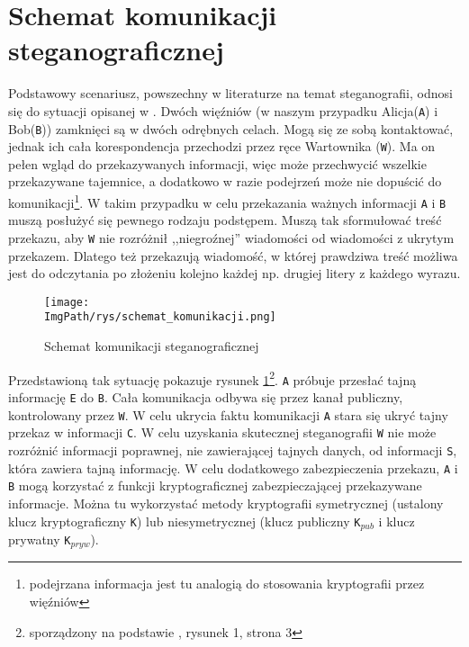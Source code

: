 \documentclass[a4paper,12pt,twoside,openany]{report}
\newcommand{\ImgPath}{.}
\newcommand{\tech}{\texttt}
\begin{document}
\section{Schemat komunikacji steganograficznej}
\label{sectionSchematKomunikacjiSteganograficznej}
Podstawowy scenariusz, powszechny w literaturze na temat steganografii, odnosi się do sytuacji opisanej w \cite{PrisonersProblem}. Dwóch więźniów (w naszym przypadku Alicja(\tech{A}) i Bob(\tech{B})) zamknięci są w dwóch odrębnych celach. Mogą się ze sobą kontaktować, jednak ich cała korespondencja przechodzi przez ręce Wartownika (\tech{W}). Ma on pełen wgląd do przekazywanych informacji, więc może przechwycić wszelkie przekazywane tajemnice, a dodatkowo w razie podejrzeń może nie dopuścić do komunikacji\footnote{podejrzana informacja jest tu analogią do stosowania kryptografii przez więźniów}. W takim przypadku w celu przekazania ważnych informacji \tech{A} i \tech{B} muszą posłużyć się pewnego rodzaju podstępem. Muszą tak sformułować treść przekazu, aby \tech{W} nie rozróżnił ,,niegroźnej'' wiadomości od wiadomości z ukrytym przekazem. Dlatego też przekazują wiadomość, w której prawdziwa treść możliwa jest do odczytania po złożeniu kolejno każdej np.  drugiej litery z każdego wyrazu.
\begin{figure}[!htbp]
	\begin{center}
\centering
\texttt{[image: \\ImgPath/rys/schemat\_komunikacji.png]}
\end{center}
	\caption{Schemat komunikacji steganograficznej}
	\label{schematKomunikacji}
\end{figure}

Przedstawioną tak sytuację pokazuje rysunek \ref{schematKomunikacji}\footnote{sporządzony na podstawie \cite{schematKomunikacjiPrzypis}, rysunek 1, strona 3}. \tech{A} próbuje przesłać tajną informację \tech{E} do \tech{B}. Cała komunikacja odbywa się przez kanał publiczny, kontrolowany przez \tech{W}. W celu ukrycia faktu komunikacji \tech{A} stara się ukryć tajny przekaz w informacji \tech{C}. W celu uzyskania skutecznej steganografii \tech{W} nie może rozróżnić informacji poprawnej, nie zawierającej tajnych danych, od informacji \tech{S}, która zawiera tajną informację. W celu dodatkowego zabezpieczenia przekazu, \tech{A} i \tech{B} mogą korzystać z funkcji kryptograficznej zabezpieczającej przekazywane informacje. Można tu wykorzystać metody kryptografii symetrycznej (ustalony klucz kryptograficzny \tech{K}) lub niesymetrycznej (klucz publiczny \tech{K}$_{pub}$ i klucz prywatny \tech{K}$_{pryw}$).
\end{document}

